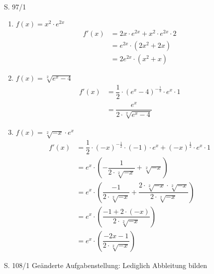 \begin{Exercise}{S. 97/1}{}
\begin{enumerate}
\begin{enumerate}[label=\alph*)]
{            }
        \item[f)] {
            $f(x) = x^{2} \cdot e^{2x}$\\[-2.0ex]
            \begin{align*}
                f'(x) &= 2x \cdot e^{2x} + x^{2} \cdot e^{2x} \cdot 2 &&\\[1.5ex]
                &= e^{2x} \cdot \left(2x^{2} + 2x\right) &&\\[1.5ex]
                &= 2e^{2x} \cdot \left(x^{2} + x\right) &&
            \end{align*}
            }
        \item[g)] {
            $f(x) = \sqrt[2]{e^x - 4}$\\[-2.0ex]
            \begin{align*}
                f'(x) &= \dfrac{1}{2} \cdot \left(e^x - 4\right)^{-\frac{1}{2}} \cdot e^{x} \cdot 1 &&\\[1.5ex]
                &= \dfrac{e^{x}}{2 \cdot \sqrt[2]{e^x - 4}}
            \end{align*}
            }
        \item[h)] {
            $f(x) = \sqrt[2]{-x} \cdot e^{x}$\\[-2.0ex]
            \begin{align*}
                f'(x) &= \dfrac{1}{2} \cdot \left(-x\right)^{-\frac{1}{2}} \cdot \left(-1\right) \cdot e^{x} + \left(-x\right)^{\frac{1}{2}} \cdot e^{x} \cdot 1 &&\\[1.5ex]
                &= e^{x} \cdot \left(-\dfrac{1}{2 \cdot \sqrt[2]{-x}} + \sqrt[2]{-x}\right) &&\\[1.5ex]
                &= e^{x} \cdot \left(\dfrac{-1}{2 \cdot \sqrt[2]{-x}} + \dfrac{2 \cdot \sqrt[2]{-x} \cdot \sqrt[2]{-x}}{2 \cdot \sqrt[2]{-x}}\right) &&\\[1.5ex]
                &= e^{x} \cdot \left(\dfrac{-1 + 2 \cdot \left(-x\right)}{2 \cdot \sqrt[2]{-x}}\right) &&\\[1.5ex]
                &= e^{x} \cdot \left(\dfrac{-2x -1}{2 \cdot \sqrt[2]{-x}}\right) &&
            \end{align*}
            }
    \end{enumerate}
\end{enumerate}
\end{Exercise}

\begin{Exercise}{S. 108/1}{}
Geänderte Aufgabenstellung: Lediglich Abbleitung bilden\\[-2.0ex]
\end{Exercise}